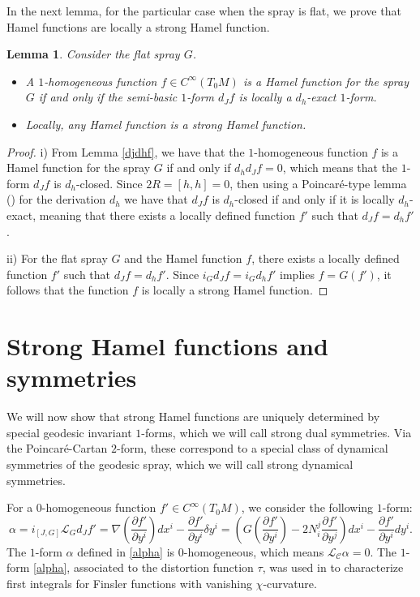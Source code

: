 \documentclass[oneside,english]{amsart}
\theoremstyle{definition}
\theoremstyle{plain}
\newtheorem{lem}[theorem]{Lemma}
\theoremstyle{plain}
\theoremstyle{plain}
\theoremstyle{remark}
\theoremstyle{remark}
\theoremstyle{remark}
\begin{document}
In the next lemma, for the particular case when the spray is flat, we prove that Hamel functions are locally a strong Hamel function.
\begin{lem}
Consider the flat spray $G$. 
\begin{itemize}
\item[i)]
A $1$-homogeneous function $f\in C^\infty(T_0M)$ is a Hamel function for the spray $G$ if and only if the semi-basic $1$-form $d_Jf$ is locally a $d_h$-exact $1$-form. 
\item[ii)] Locally, any Hamel function is a strong Hamel function. 
 \end{itemize}
\end{lem}
\begin{proof}
i) From Lemma \ref{djdhf}, we have that the $1$-homogeneous function $f$ is a Hamel function for the spray $G$ if and only if $d_hd_Jf=0$, which means that the $1$-form $d_Jf$ is $d_h$-closed. Since $2R=[h,h]=0$, then using a Poincar\'e-type lemma (\cite[Theorem 3.2]{Stone73}) for the derivation $d_h$ we have that $d_Jf$ is $d_h$-closed if and only if it is locally $d_h$-exact, meaning that there exists a locally defined function $f'$ such that $d_Jf=d_hf'$.

ii) For the flat spray $G$ and the Hamel function $f$, there exists a locally defined function $f'$ such that $d_Jf=d_hf'$. Since $i_Gd_Jf=i_Gd_hf'$ implies $f=G(f')$, it follows that the function $f$ is locally a strong Hamel function.
\end{proof}

\section{Strong Hamel functions and symmetries}

We will now show that strong Hamel functions are uniquely determined by special geodesic invariant $1$-forms, which we will call strong dual symmetries. Via the Poincar\'e-Cartan $2$-form, these correspond to a special class of dynamical symmetries of the geodesic spray, which we will call strong dynamical symmetries. 

For a $0$-homogeneous function $f'\in C^{\infty}(T_0M)$, we consider the following $1$-form:
\begin{equation}\label{alpha}
\alpha = i_{[J,G]}\mathcal{L}_Gd_Jf' = \nabla\left(\dfrac{\partial f'}{\partial y^i}\right)dx^i-\dfrac{\partial f'}{\partial y^i}\delta y^i = \left(G\left(\dfrac{\partial f'}{\partial y^i}\right) - 2N^j_i\dfrac{\partial f'}{\partial y^j}\right)dx^i-\dfrac{\partial f'}{\partial y^i} d y^i.
\end{equation} 
The $1$-form $\alpha$ defined in \eqref{alpha} is $0$-homogeneous, which means $\mathcal{L}_{\mathcal{C}}\alpha=0$. The $1$-form \eqref{alpha}, associated to the distortion function $\tau$, was used in \cite{BCC22} to characterize first integrals for Finsler functions with vanishing $\chi$-curvature. 
\end{document}
